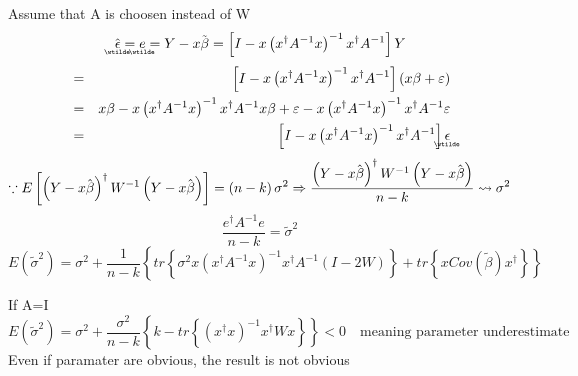 \documentclass{article}
\begin{document}
Assume that A is choosen instead of W%
\begin{equation*}
\underaccent{\wtilde}{\hat{\epsilon}}%
=%
\underaccent{\wtilde}{e}%
=Y-x\tilde{\beta}=\left[ I-x\left( x^{\dagger }A^{-1}x\right)
^{-1}x^{\dagger }A^{-1}\right] Y
\end{equation*}%
\begin{eqnarray*}
&=&\left[ I-x\left( x^{\dagger }A^{-1}x\right) ^{-1}x^{\dagger }A^{-1}\right]
\left( x\beta +\varepsilon \right) \\
&=&x\beta -x\left( x^{\dagger }A^{-1}x\right) ^{-1}x^{\dagger }A^{-1}x\beta
+\varepsilon -x\left( x^{\dagger }A^{-1}x\right) ^{-1}x^{\dagger
}A^{-1}\varepsilon \\
&=&\left[ I-x\left( x^{\dagger }A^{-1}x\right) ^{-1}x^{\dagger }A^{-1}\right]
\underaccent{\wtilde}{\epsilon}%
\end{eqnarray*}%
\begin{equation*}
\because E\left[ \left( Y-x\hat{\beta}\right) ^{\dagger }W^{-1}\left( Y-x%
\hat{\beta}\right) \right] =\left( n-k\right) \sigma ^{2}\Rightarrow \frac{%
\left( Y-x\hat{\beta}\right) ^{\dagger }W^{-1}\left( Y-x\hat{\beta}\right) }{%
n-k}\leadsto \sigma ^{2}
\end{equation*}%
\begin{equation*}
\frac{e^{\dagger }A^{-1}e}{n-k}=\tilde{\sigma}^{2}
\end{equation*}%
\begin{equation*}
E\left( \tilde{\sigma}^{2}\right) =\sigma ^{2}+\frac{1}{n-k}\left\{
tr\left\{ \sigma ^{2}x\left( x^{\dagger }A^{-1}x\right) ^{-1}x^{\dagger
}A^{-1}\left( I-2W\right) \right\} +tr\left\{ xCov\left( \tilde{\beta}%
\right) x^{\dagger }\right\} \right\}
\end{equation*}

If A=I%
\begin{equation*}
E\left( \tilde{\sigma}^{2}\right) =\sigma ^{2}+\frac{\sigma ^{2}}{n-k}%
\left\{ k-tr\left\{ \left( x^{\dagger }x\right) ^{-1}x^{\dagger }Wx\right\}
\right\} <0\quad \text{meaning parameter underestimate}
\end{equation*}%
Even if paramater are obvious, the result is not obvious
\end{document}
